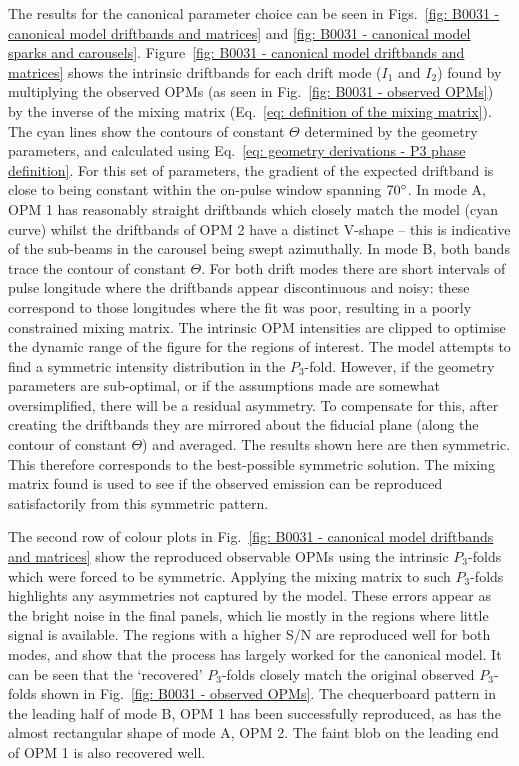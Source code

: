 The results for the canonical parameter choice can be seen in Figs.~\ref{fig: B0031 - canonical model driftbands and matrices} and \ref{fig: B0031 - canonical model sparks and carousels}. Figure~\ref{fig: B0031 - canonical model driftbands and matrices} shows the intrinsic driftbands for each drift mode ($I_1$ and $I_2$) found by multiplying the observed OPMs (as seen in Fig.~\ref{fig: B0031 - observed OPMs}) by the inverse of the mixing matrix (Eq.~\eqref{eq: definition of the mixing matrix}). The cyan lines show the contours of constant $\Theta$ determined by the geometry parameters, and calculated using Eq.~\eqref{eq: geometry derivations - P3 phase definition}. For this set of parameters, the gradient of the expected driftband is close to being constant within the on-pulse window spanning $70^\circ$. In mode A, OPM 1 has reasonably straight driftbands which closely match the model (cyan curve) whilst the driftbands of OPM 2 have a distinct V-shape -- this is indicative of the sub-beams in the carousel being swept azimuthally. In mode B, both bands trace the contour of constant $\Theta$. For both drift modes there are short intervals of pulse longitude where the driftbands appear discontinuous and noisy: these correspond to those longitudes where the fit was poor, resulting in a poorly constrained mixing matrix. The intrinsic OPM intensities are clipped to optimise the dynamic range of the figure for the regions of interest. The model attempts to find a symmetric intensity distribution in the $P_3$-fold. However, if the geometry parameters are sub-optimal, or if the assumptions made are somewhat oversimplified, there will be a residual asymmetry. To compensate for this, after creating the driftbands they are mirrored about the fiducial plane (along the contour of constant $\Theta$) and averaged. The results shown here are then symmetric. This therefore corresponds to the best-possible symmetric solution. The mixing matrix found is used to see if the observed emission can be reproduced satisfactorily from this symmetric pattern.

The second row of colour plots in Fig.~\ref{fig: B0031 - canonical model driftbands and matrices} show the reproduced observable OPMs using the intrinsic $P_3$-folds which were forced to be symmetric. Applying the mixing matrix to such $P_3$-folds highlights any asymmetries not captured by the model. These errors appear as the bright noise in the final panels, which lie mostly in the regions where little signal is available. The regions with a higher S/N are reproduced well for both modes, and show that the process has largely worked for the canonical model. It can be seen that the `recovered' $P_3$-folds closely match the original observed $P_3$-folds shown in Fig.~\ref{fig: B0031 - observed OPMs}. The chequerboard pattern in the leading half of mode B, OPM 1 has been successfully reproduced, as has the almost rectangular shape of mode A, OPM 2. The faint blob on the leading end of OPM 1 is also recovered well. 

